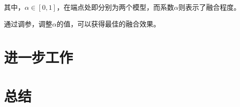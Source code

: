 \documentclass[utf8, a4paper,12pt, onecolumn]{ctexart}
\begin{document}
\begin{spacing}{1.3}
其中，$\alpha \in [0, 1]$，在端点处即分别为两个模型，而系数$\alpha$则表示了融合程度。

通过调参，调整$\alpha$的值，可以获得最佳的融合效果。

\section{进一步工作}

\section{总结}


\renewcommand\refname{参考文献}



\end{spacing}
\end{document}
